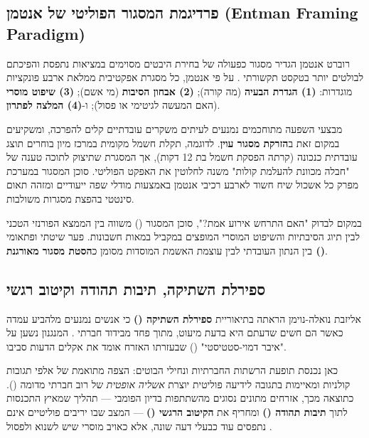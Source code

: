 \subsection{פרדיגמת המסגור הפוליטי של אנטמן (Entman Framing Paradigm)}
רוברט אנטמן הגדיר מסגור כפעולה של בחירת היבטים מסוימים במציאות נתפסת והפיכתם לבולטים יותר בטקסט תקשורתי \cite{entman1993}. על פי אנטמן, כל מסגרת אפקטיבית ממלאת ארבע פונקציות מוגדרות: \textbf{(1) הגדרת הבעיה} (מה קורה); \textbf{(2) אבחון הסיבות} (מי אשם); \textbf{(3) שיפוט מוסרי} (האם המעשה לגיטימי או פסול); ו-\textbf{(4) המלצה לפתרון}.

מבצעי השפעה מתוחכמים נמנעים לעיתים משקרים עובדתיים קלים להפרכה, ומשקיעים במקום זאת ב\textbf{הזרקת מסגור עוין}. לדוגמה, תקלת חשמל מקומית במרכז מיון בוחרים תוצג עובדתית כנכונה (קרתה הפסקת חשמל בת 12 דקות), אך המסגרת שתיצוק לתוכה טענה של "חבלה מכוונת להעלמת קולות" משנה לחלוטין את האפקט הפוליטי. סוכן המסגור במערכת מפרק כל אשכול שיח חשוד לארבע רכיבי אנטמן באמצעות מודלי שפה ייעודיים ומזהה תאום סינטטי בהפצת מסגרות משולבות.

\begin{theorybox}
במקום לבדוק "האם התרחש אירוע אמת?", סוכן המסגור () משווה בין הממצא הפורנזי הטכני לבין תיוג הסיבתיות והשיפוט המוסרי המופצים במקביל במאות חשבונות. פער שיטתי ופתאומי בין הנתון העובדתי לבין עוצמת האשמת המוסדות מסומן כ\textbf{הסטת מסגור מאורגנת ()}.
\end{theorybox}

\subsection{ספירלת השתיקה, תיבות תהודה וקיטוב רגשי}
אליזבת נואלה-נוימן הראתה בתיאוריית \textbf{ספירלת השתיקה ()} כי אנשים נמנעים מלהביע עמדה כאשר הם חשים שדעתם היא בדעת מיעוט, מתוך פחד מבידוד חברתי \cite{noelle1974}. המנגנון נשען על "איבר דמוי-סטטיסטי" () שבעזרתו האזרח אומד את אקלים הדעות סביבו.

כאן נכנסת תופעת הרשתות החברתיות ונחילי הבוטים: הצפה מתואמת של אלפי תגובות קולניות ומאיימות בתגובה לידיעה פוליטית יוצרת \emph{אשליה אופטית} של רוב חברתי מדומה (). כתוצאה מכך, אזרחים מתונים נסוגים מהשתתפות בדיון הפומבי — תהליך שמאיץ התכנסות לתוך \textbf{תיבות תהודה ()} \cite{sunstein2017} ומחריף את \textbf{הקיטוב הרגשי ()} — המצב שבו יריבים פוליטיים אינם נתפסים עוד כבעלי דעה שונה, אלא כאויב מוסרי שיש לשנוא ולפסול \cite{iyengar2019}.

